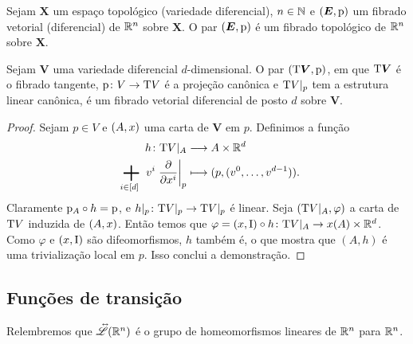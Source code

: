 \begin{proposition}
Sejam $\bm X$ um espaço topológico (variedade diferencial), $n \in \mathbb{N}$ e $(\bm E,\mathrm{p})$ um fibrado vetorial (diferencial) de $\mathbb{R}^n$ sobre $\bm X$. O par $(\bm E,\mathrm{p})$ é um fibrado topológico de $\mathbb{R}^n$ sobre $\bm X$.
\end{proposition}

\begin{proposition}
Sejam $\bm V$ uma variedade diferencial $d$-dimensional. O par $(\mathrm{T} \bm V,\mathrm{p})$, em que $\mathrm{T} \bm V$ é o fibrado tangente, $\mathrm{p}\colon V \to \mathrm{T} V$ é a projeção canônica e $\mathrm{T} V|_p$ tem a estrutura linear canônica, é um fibrado vetorial diferencial de posto $d$ sobre $\bm V$.
\end{proposition}
\begin{proof}
Sejam $p \in V$ e $(A,x)$ uma carta de $\bm V$ em $p$. Definimos a função
	\begin{align*}
	\func{h}{\Tg V|_A}{A \times \R^d}{\sum_{i \in [d]} v^i \derr{\x^i}_p}{(p,(v^0,\ldots,v^{d-1}))}.
	\end{align*}
Claramente $\mathrm{p}_A \circ h = \mathrm{p}$, e $h|_p\colon \mathrm{T} V|_p \to \mathrm{T} V|_p$ é linear. Seja $(\mathrm{T} V|_A,\varphi)$ a carta de $\mathrm{T} V$ induzida de $(A,x)$. Então temos que $\varphi = (x,\mathrm{I}) \circ h\colon \mathrm{T} V|_A \to x(A) \times \mathbb{R}^d$. Como $\varphi$ e $(x,\mathrm{I})$ são difeomorfismos, $h$ também é, o que mostra que $(A,h)$ é uma trivialização local em $p$. Isso conclui a demonstração.
\end{proof}

\subsection{Funções de transição}

Relembremos que $\accentset{\leftrightarrow}{\mathscr{L}}(\mathbb{R}^n)$ é o grupo de homeomorfismos lineares de $\mathbb{R}^n$ para $\mathbb{R}^n$.


